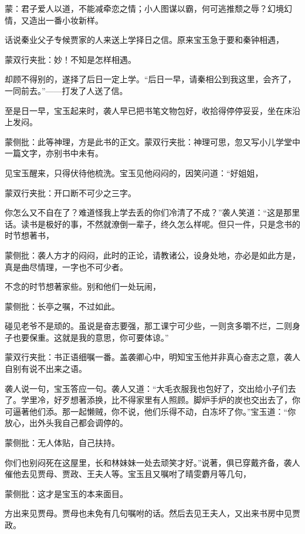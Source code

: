 
\begin{parag}
    \begin{note}蒙：君子爱人以道，不能减牵恋之情；小人图谋以霸，何可逃推颓之辱？幻境幻情，又造出一番小妆新样。\end{note}
\end{parag}


\begin{parag}
    话说秦业父子专候贾家的人来送上学择日之信。原来宝玉急于要和秦钟相遇，\begin{note}蒙双行夹批：妙！不知是怎样相遇。\end{note}却顾不得别的，遂择了后日一定上学。“后日一早，请秦相公到我这里，会齐了，一同前去。”——打发了人送了信。
\end{parag}


\begin{parag}
    至是日一早，宝玉起来时，袭人早已把书笔文物包好，收拾得停停妥妥，坐在床沿上发闷。\begin{note}蒙侧批：此等神理，方是此书的正文。蒙双行夹批：神理可思，忽又写小儿学堂中一篇文字，亦别书中未有。\end{note}见宝玉醒来，只得伏待他梳洗。宝玉见他闷闷的，因笑问道：“好姐姐，\begin{note}蒙双行夹批：开口断不可少之三字。\end{note}你怎么又不自在了？难道怪我上学去丢的你们冷清了不成？”袭人笑道：“这是那里话。读书是极好的事，不然就潦倒一辈子，终久怎么样呢。但只一件，只是念书的时节想著书，\begin{note}蒙侧批：袭人方才的闷闷，此时的正论，请教诸公，设身处地，亦必是如此方是，真是曲尽情理，一字也不可少者。\end{note}不念的时节想著家些。别和他们一处玩闹，\begin{note}蒙侧批：长亭之嘱，不过如此。\end{note}碰见老爷不是顽的。虽说是奋志要强，那工课宁可少些，一则贪多嚼不烂，二则身子也要保重。这就是我的意思，你可要体谅。”\begin{note}蒙双行夹批：书正语细嘱一番。盖袭卿心中，明知宝玉他并非真心奋志之意，袭人自别有说不出来之语。\end{note}袭人说一句，宝玉答应一句。袭人又道：“大毛衣服我也包好了，交出给小子们去了。学里冷，好歹想著添换，比不得家里有人照顾。脚炉手炉的炭也交出去了，你可逼著他们添。那一起懒贼，你不说，他们乐得不动，白冻坏了你。”宝玉道：“你放心，出外头我自己都会调停的。\begin{note}蒙侧批：无人体贴，自己扶持。\end{note}你们也别闷死在这屋里，长和林妹妹一处去顽笑才好。”说著，俱已穿戴齐备，袭人催他去见贾母、贾政、王夫人等。宝玉且又嘱咐了晴雯麝月等几句，\begin{note}蒙侧批：这才是宝玉的本来面目。\end{note}方出来见贾母。贾母也未免有几句嘱咐的话。然后去见王夫人，又出来书房中见贾政。
\end{parag}



